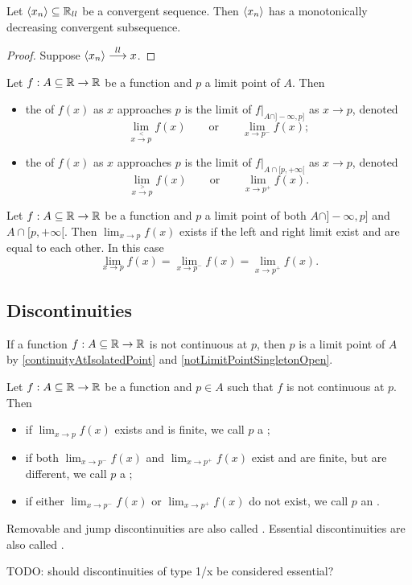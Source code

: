 \begin{lemma}
Let $\left\langle x_n \right\rangle\subseteq \mathbb{R}_{ll}$ be a convergent sequence. Then $\left\langle x_n \right\rangle$ has a monotonically decreasing convergent subsequence.
\end{lemma}
\begin{proof}
Suppose $\left\langle x_n \right\rangle \overset{ll}{\longrightarrow} x$.
\end{proof}

\begin{definition}
Let $f:A\subseteq\mathbb{R}\to\mathbb{R}$ be a function and $p$ a limit point of $A$. Then
\begin{itemize}
\item the  of $f(x)$ as $x$ approaches $p$ is the limit of $f|_{A\cap]-\infty,p]}$ as $x\to p$, denoted
\[ \lim_{x\overset{<}{\to} p}f(x) \qquad \text{or} \qquad \lim_{x\to p^-}f(x); \]
\item the  of $f(x)$ as $x$ approaches $p$ is the limit of $f|_{A\cap[p,+\infty[}$ as $x\to p$, denoted
\[ \lim_{x\overset{>}{\to} p}f(x) \qquad \text{or} \qquad \lim_{x\to p^+}f(x). \]
\end{itemize}
\end{definition}
\begin{lemma}
Let $f:A\subseteq\mathbb{R}\to\mathbb{R}$ be a function and $p$ a limit point of both $A\cap]-\infty,p]$ and $A\cap[p,+\infty[$. Then $\lim_{x\to p} f(x)$ exists if the left and right limit exist and are equal to each other. In this case
\[ \lim_{x\to p} f(x) = \lim_{x\to p^-} f(x) = \lim_{x\to p^+} f(x). \]
\end{lemma}

\subsection{Discontinuities}
If a function $f:A\subseteq\mathbb{R}\to\mathbb{R}$ is not continuous at $p$, then $p$ is a limit point of $A$ by \ref{continuityAtIsolatedPoint} and \ref{notLimitPointSingletonOpen}.
\begin{definition}
Let $f:A\subseteq\mathbb{R}\to\mathbb{R}$ be a function and $p\in A$ such that $f$ is not continuous at $p$. Then
\begin{itemize}
\item if $\lim_{x\to p}f(x)$ exists and is finite, we call $p$ a ;
\item if both $\lim_{x\to p^-}f(x)$ and $\lim_{x\to p^+}f(x)$ exist and are finite, but are different, we call $p$ a ;
\item if either $\lim_{x\to p^-}f(x)$ or $\lim_{x\to p^+}f(x)$ do not exist, we call $p$ an .
\end{itemize}
Removable and jump discontinuities are also called . Essential discontinuities are also called .
\end{definition}
TODO: should discontinuities of type 1/x be considered essential?

